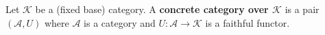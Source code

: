 Let $\mathcal{K}$ be a (fixed base) category. A \textbf{concrete category over $\mathcal{K}$} is a pair $(\mathcal{A}, U)$ where $\mathcal{A}$ is a category and $U: \mathcal{A} \to \mathcal{K}$ is a faithful functor.
